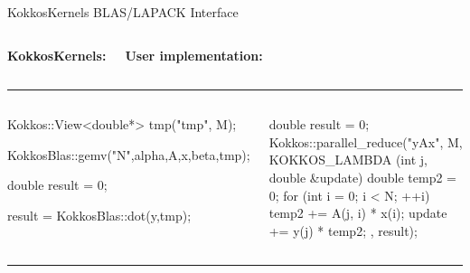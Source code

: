 \begin{frame}[fragile]{KokkosKernels BLAS/LAPACK Interface}

\vspace{-1em}

  \begin{columns}[t,onlytextwidth]
      \begin{center}
        \textbf{KokkosKernels:}
      \end{center}
      \begin{center}
        \textbf{User implementation:}
      \end{center}
  \end{columns}

\noindent\rule{4in}{0.4pt}

  \begin{columns}[t,onlytextwidth]
      \begin{flushleft}
      \vspace{-2em}
  \begin{code}[keywords={View,double,gemv,dot}, basicstyle=\tiny, breaklines=true]
Kokkos::View<double*> tmp("tmp", M);

KokkosBlas::gemv("N",alpha,A,x,beta,tmp);


double result = 0;

result = KokkosBlas::dot(y,tmp);
  \end{code}
      \end{flushleft}
      \begin{flushright}
      \vspace{-2em}
  \begin{code}[keywords={parallel_reduce,for,int,double}, basicstyle=\tiny, breaklines=true]
double result = 0;
Kokkos::parallel_reduce("yAx", M,
 KOKKOS_LAMBDA (int j, double &update) {
  double temp2 = 0;
   for (int i = 0; i < N; ++i) {
     temp2 += A(j, i) * x(i);
   }
   update += y(j) * temp2;
 }, result);
  \end{code}
      \end{flushright}
  \end{columns}

\noindent\rule{4in}{0.4pt}


\end{frame}
